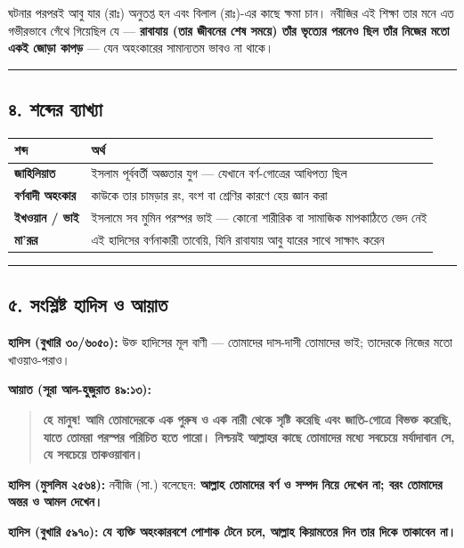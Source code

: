 ঘটনার পরপরই আবু যার (রাঃ) অনুতপ্ত হন এবং বিলাল (রাঃ)-এর কাছে ক্ষমা চান। নবীজির এই শিক্ষা তার মনে এত গভীরভাবে গেঁথে গিয়েছিল যে — \textbf{রাবাযায় (তার জীবনের শেষ সময়ে) তাঁর ভৃত্যের পরনেও ছিল তাঁর নিজের মতো একই জোড়া কাপড়} — যেন অহংকারের সামান্যতম ভাবও না থাকে।

\medskip\hrule\medskip

\subsection*{৪. শব্দের ব্যাখ্যা}

\begin{table}[h]\centering\small
\begin{tabular}{ll}
শব্দ & অর্থ \\
\hline
\textbf{জাহিলিয়াত} & ইসলাম পূর্ববর্তী অজ্ঞতার যুগ — যেখানে বর্ণ-গোত্রের আধিপত্য ছিল \\
\textbf{বর্ণবাদী অহংকার} & কাউকে তার চামড়ার রং, বংশ বা শ্রেণির কারণে হেয় জ্ঞান করা \\
\textbf{ইখওয়ান / ভাই} & ইসলামে সব মুমিন পরস্পর ভাই — কোনো শারীরিক বা সামাজিক মাপকাঠিতে ভেদ নেই \\
\textbf{মা'রূর} & এই হাদিসের বর্ণনাকারী তাবেয়ি, যিনি রাবাযায় আবু যারের সাথে সাক্ষাৎ করেন \\
\hline
\end{tabular}
\end{table}

\medskip\hrule\medskip

\subsection*{৫. সংশ্লিষ্ট হাদিস ও আয়াত}

\textbf{হাদিস (বুখারি ৩০/৬০৫০):} উক্ত হাদিসের মূল বাণী — তোমাদের দাস-দাসী তোমাদের ভাই; তাদেরকে নিজের মতো খাওয়াও-পরাও।

\textbf{আয়াত (সূরা আল-হুজুরাত ৪৯:১৩):}
\begin{quote}
\textbf{হে মানুষ! আমি তোমাদেরকে এক পুরুষ ও এক নারী থেকে সৃষ্টি করেছি এবং জাতি-গোত্রে বিভক্ত করেছি, যাতে তোমরা পরস্পর পরিচিত হতে পারো। নিশ্চয়ই আল্লাহর কাছে তোমাদের মধ্যে সবচেয়ে মর্যাদাবান সে, যে সবচেয়ে তাকওয়াবান।}
\end{quote}

\textbf{হাদিস (মুসলিম ২৫৬৪):} নবীজি (সা.) বলেছেন: \textbf{আল্লাহ তোমাদের বর্ণ ও সম্পদ নিয়ে দেখেন না; বরং তোমাদের অন্তর ও আমল দেখেন।}

\textbf{হাদিস (বুখারি ৫৯৭০):} \textbf{যে ব্যক্তি অহংকারবশে পোশাক টেনে চলে, আল্লাহ কিয়ামতের দিন তার দিকে তাকাবেন না।}

